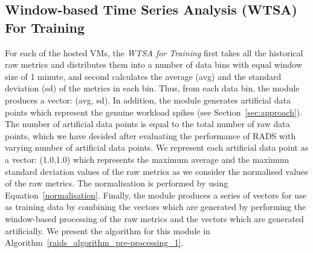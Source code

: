 \subsection{Window-based Time Series Analysis (WTSA) For Training}
\noindent For each of the hosted VMs, the \textit{WTSA for Training} first takes all the historical raw metrics and distributes them into a number of data bins with equal window size of 1 minute, and second calculates the average (avg) and the standard deviation (sd) of the metrics in each bin. Thus, from each data bin, the module produces a vector: (avg, sd). 
In addition, the module generates artificial data points which represent the genuine workload spikes (see Section~\ref{sec:approach}). 
The number of artificial data points is equal to the total number of raw data points, which we have decided after evaluating the performance of RADS with varying number of artificial data points.
We represent each artificial data point as a vector: (1.0,1.0) which represents the maximum average and the maximum standard deviation values of the raw metrics as we consider the normalised values of the raw metrics. The normalisation is performed by using Equation~\ref{normalisation}. 
Finally, the module produces a series of vectors for use as training data by combining the vectors which are generated by performing the window-based processing of the raw metrics and the vectors which are generated artificially. 
We present the algorithm for this module in Algorithm~\ref{raids_algorithm_pre-processing_1}.

